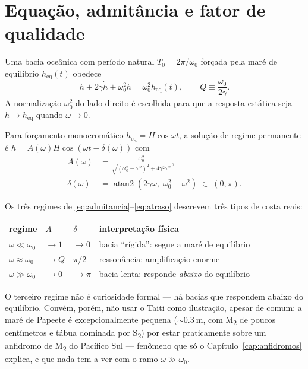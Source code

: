 \documentclass[11pt,a4paper,oneside]{report}
\theoremstyle{definition}
\theoremstyle{plain}
\theoremstyle{remark}
\DeclareMathOperator{\atantwo}{atan2}
\begin{document}
\section{Equação, admitância e fator de qualidade}

Uma bacia oceânica com período natural $T_0=2\pi/\omega_0$ forçada pela maré de
equilíbrio $h_{\text{eq}}(t)$ obedece
\begin{equation}
\ddot{h}+2\gamma\dot{h}+\omega_0^{2}h=\omega_0^{2}h_{\text{eq}}(t),
\qquad Q\equiv\frac{\omega_0}{2\gamma}.
\label{eq:oscilador}
\end{equation}
A normalização $\omega_0^2$ do lado direito é escolhida para que a resposta
estática seja $h\to h_{\text{eq}}$ quando $\omega\to 0$.

Para forçamento monocromático $h_{\text{eq}}=H\cos\omega t$, a solução de
regime permanente é $h=A(\omega)H\cos(\omega t-\delta(\omega))$ com
\begin{align}
A(\omega)&=\frac{\omega_0^{2}}
  {\sqrt{(\omega_0^{2}-\omega^{2})^{2}+4\gamma^{2}\omega^{2}}},
\label{eq:admitancia}\\[4pt]
\delta(\omega)&=\atantwo\!\left(2\gamma\omega,\;\omega_0^{2}-\omega^{2}\right)
\;\in\;(0,\pi).
\label{eq:atraso}
\end{align}

Os três regimes de \eqref{eq:admitancia}--\eqref{eq:atraso} descrevem três
tipos de costa reais:

\begin{center}
\begin{tabular}{@{}llll@{}}
\toprule
regime & $A$ & $\delta$ & interpretação física \\
\midrule
$\omega\ll\omega_0$ & $\to 1$ & $\to 0$ & bacia ``rígida'': segue a maré de equilíbrio \\
$\omega\approx\omega_0$ & $\to Q$ & $\pi/2$ & ressonância: amplificação enorme \\
$\omega\gg\omega_0$ & $\to 0$ & $\to\pi$ & bacia lenta: responde \emph{abaixo} do equilíbrio \\
\bottomrule
\end{tabular}
\end{center}

O terceiro regime não é curiosidade formal — há bacias que respondem abaixo do
equilíbrio. Convém, porém, não usar o Taiti como ilustração, apesar de comum: a
maré de Papeete é excepcionalmente pequena ($\sim\SI{0.3}{\meter}$, com
M\textsubscript{2} de poucos centímetros e tábua dominada por
S\textsubscript{2}) por estar praticamente sobre um anfidromo de
M\textsubscript{2} do Pacífico Sul — fenômeno que só o
Capítulo~\ref{cap:anfidromos} explica, e que nada tem a ver com o ramo
$\omega\gg\omega_0$.
\end{document}
